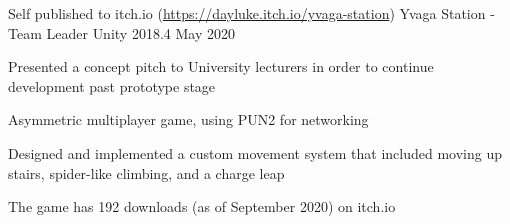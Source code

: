 

\begin{cventries}

    \cventry
    {Self published to itch.io (\href{https://dayluke.itch.io/yvaga-station}{https://dayluke.itch.io/yvaga-station})}
    {Yvaga Station - Team Leader}
    {Unity 2018.4}
    {May 2020}
    {
        \begin{cvitems}
            \item Presented a concept pitch to University lecturers in order to continue development past prototype stage
            \item Asymmetric multiplayer game, using PUN2 for networking
            \item Designed and implemented a custom movement system that included moving up stairs, spider-like climbing, and a charge leap
            \item The game has 192 downloads (as of September 2020) on itch.io
        \end{cvitems}
    }
\end{cventries}